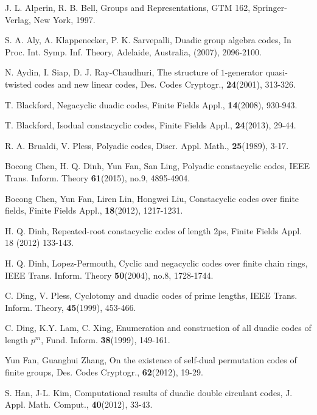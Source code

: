 \documentclass{article}
\numberwithin{equation}{section}
\numberwithin{table}{section}
\begin{document}
\begin{thebibliography}{99}

 J. L. Alperin, R. B. Bell,
Groups and Representations, GTM 162, Springer-Verlag, New York, 1997.

S. A. Aly, A. Klappenecker, P. K.  Sarvepalli, Duadic group algebra codes,
In Proc. Int. Symp. Inf. Theory, Adelaide, Australia, (2007),  2096-2100.

N. Aydin, I. Siap, D. J. Ray-Chaudhuri,
The structure of $1$-generator quasi-twisted codes and new linear codes,
Des. Codes Cryptogr., {\bf 24}(2001),  313-326.

 T. Blackford,
Negacyclic duadic codes,  Finite Fields Appl.,
{\bf 14}(2008),  930-943.

 T. Blackford,
Isodual constacyclic codes,
Finite Fields Appl., {\bf 24}(2013), 29-44.

R. A. Brualdi, V. Pless, Polyadic codes,
Discr. Appl. Math., {\bf 25}(1989), 3-17.


Bocong Chen, H. Q. Dinh, Yun Fan, San Ling,
Polyadic constacyclic codes, %
IEEE Trans. Inform. Theory {\bf 61}(2015), no.9, 4895-4904.


 Bocong Chen, Yun Fan, Liren Lin, Hongwei Liu,
Constacyclic codes over finite fields,
Finite Fields Appl., {\bf 18}(2012), 1217-1231.


 H. Q. Dinh,
Repeated-root constacyclic codes of length 2ps,
Finite Fields Appl. 18 (2012) 133-143.

 H. Q. Dinh, Lopez-Permouth,
Cyclic and negacyclic codes over finite chain rings,
IEEE Trans. Inform. Theory {\bf 50}(2004), no.8, 1728-1744.

C. Ding, V. Pless, Cyclotomy and duadic codes of prime lengths,
IEEE Trans. Inform. Theory, {\bf 45}(1999), 453-466.

C. Ding, K.Y. Lam, C. Xing,
Enumeration and construction of all duadic codes of length $p^m$,
Fund. Inform. {\bf 38}(1999),  149-161.

 Yun Fan, Guanghui Zhang,
On the existence of self-dual permutation codes of finite groups,
Des. Codes Cryptogr., {\bf 62}(2012),  19-29.


S. Han, J-L. Kim, Computational results of duadic double circulant codes,
J.  Appl.  Math. Comput.,  {\bf 40}(2012),  33-43.


\end{thebibliography}
\end{document}
